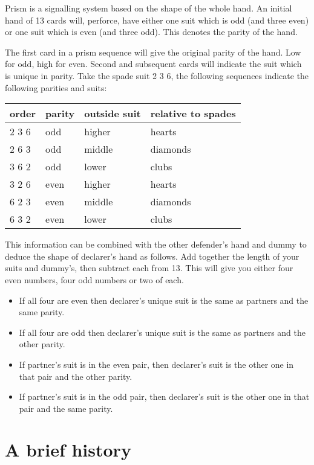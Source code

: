 \documentclass[a4paper,14pt]{extarticle}
\begin{document}
Prism is a signalling system based on the shape of the whole hand. An initial
hand of 13 cards will, perforce, have either one suit which is odd (and three
even) or one suit which is even (and three odd). This denotes the parity of the
hand.

The first card in a prism sequence will give the original parity of the hand.
Low for odd, high for even. Second and subsequent cards will indicate the suit
which is unique in parity. Take the spade suit 2 3 6, the following sequences indicate
the following parities and suits:

\begin{tabular}{llll}
\bf order & \bf parity & \bf outside suit & \bf relative to spades \\
\hline
2 3 6 & odd    & higher       & hearts \\
2 6 3 & odd    & middle       & diamonds \\
3 6 2 & odd    & lower        & clubs \\
3 2 6 & even   & higher       & hearts \\
6 2 3 & even   & middle       & diamonds \\
6 3 2 & even   & lower        & clubs \\
\end{tabular}

This information can be combined with the other defender's hand and dummy to
deduce the shape of declarer's hand as follows. Add together the length of your
suits and dummy's, then subtract each from 13. This will give you either four
even numbers, four odd numbers or two of each.

\begin{itemize}
\item If all four are even then declarer's unique suit is the same as partners and the same parity.
\item If all four are odd then declarer's unique suit is the same as partners and the other parity.
\item If partner's suit is in the even pair, then declarer's suit is the other one in that pair and the other parity.
\item If partner's suit is in the odd pair, then declarer's suit is the other one in that pair and the same parity.
\end{itemize}

\newpage

\section{A brief history}
\label{sec:history}
\end{document}
